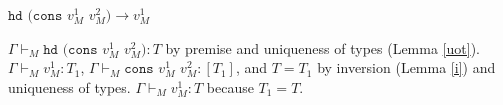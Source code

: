 \begin{case}
$\mathtt{hd}$ $(\mathtt{cons}$ $v_{M}^{1}$ $v_{M}^{2})\rightarrow v_{M}^{1}$

$\Gamma\vdash_{M}\mathtt{hd}$ $(\mathtt{cons}$ $v_{M}^{1}$ $v_{M}^{2}):T$ by premise and uniqueness of types (Lemma \ref{uot}).  $\Gamma\vdash_{M}v_{M}^{1}:T_{1}$, $\Gamma\vdash_{M}\mathtt{cons}$ $v_{M}^{1}$ $v_{M}^{2}:[T_{1}]$, and $T=T_{1}$ by inversion (Lemma \ref{i}) and uniqueness of types.  $\Gamma\vdash_{M}v_{M}^{1}:T$ because $T_{1}=T$.
\end{case}